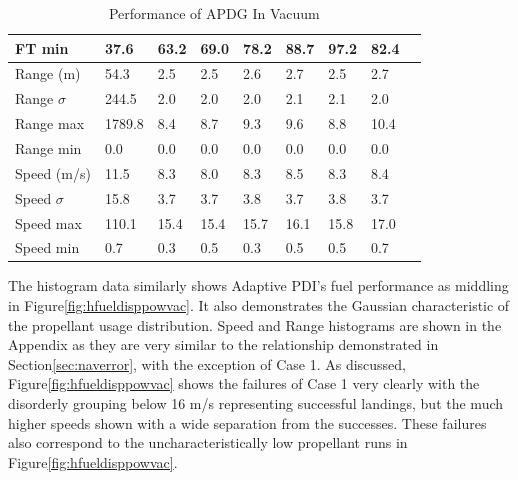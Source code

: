 \begin{table}[H]
\begin{tabularx}{\textwidth}{@{}lYYYYYYYY@{}}
		FT min & 37.6 & 63.2 & 69.0 & 78.2 & 88.7 & 97.2 & 82.4 \\                       
		\toprule                                                                           
		Range (m) & 54.3 & 2.5 & 2.5 & 2.6 & 2.7 & 2.5 & 2.7 \\                          
                                                                         
		Range $\sigma$ & 244.5 & 2.0 & 2.0 & 2.0 & 2.1 & 2.1 & 2.0 \\                    
                                                                          
		Range max & 1789.8 & 8.4 & 8.7 & 9.3 & 9.6 & 8.8 & 10.4 \\                       
                                                                        
		Range min & 0.0 & 0.0 & 0.0 & 0.0 & 0.0 & 0.0 & 0.0 \\                           
		\toprule                                                                           
		Speed (m/s) & 11.5 & 8.3 & 8.0 & 8.3 & 8.5 & 8.3 & 8.4 \\                        
                                                                         
		Speed $\sigma$ & 15.8 & 3.7 & 3.7 & 3.8 & 3.7 & 3.8 & 3.7 \\                     
                                                                        
		Speed max & 110.1 & 15.4 & 15.4 & 15.7 & 16.1 & 15.8 & 17.0 \\                   
                                                                        
		Speed min & 0.7 & 0.3 & 0.5 & 0.3 & 0.5 & 0.5 & 0.7 \\                           
		\bottomrule                                                                           
	\end{tabularx}                                                                    
	\caption{Performance of APDG In Vacuum}                                          
	\label{tab:disppowvac}                                                     
\end{table}  

The histogram data similarly shows Adaptive PDI's fuel performance as middling in Figure\:\ref{fig:hfueldisppowvac}. It also demonstrates the Gaussian characteristic of the propellant usage distribution. Speed and Range histograms are shown in the Appendix as they are very similar to the relationship demonstrated in Section\:\ref{sec:naverror}, with the exception of Case 1. As discussed, Figure\:\ref{fig:hfueldisppowvac} shows the failures of Case 1 very clearly with the disorderly grouping below 16 m/s representing successful landings, but the much higher speeds shown with a wide separation from the successes. These failures also correspond to the uncharacteristically low propellant runs in Figure\:\ref{fig:hfueldisppowvac}.

